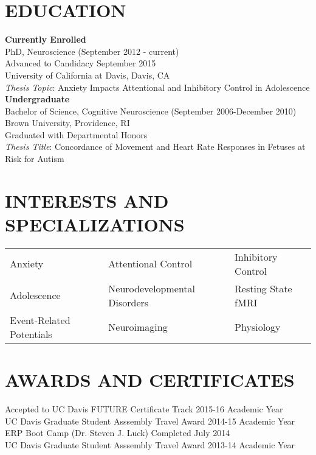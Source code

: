 \documentclass[line,margin,10pt]{res}
\begin{document}
\address{1333 Arlington Blvd Apt 6, Davis, CA 95616}
\address{phone:(401) 440 5228\\ e-mail:abbiepopa@gmail.com}


 
\begin{resume}
 
\section{EDUCATION} 
\textbf{Currently Enrolled}\\PhD, Neuroscience (September 2012 - current)\\
Advanced to Candidacy September 2015\\
University of California at Davis, Davis, CA\\
\emph{Thesis Topic}: Anxiety Impacts Attentional and Inhibitory Control in Adolescence\\
\textbf{Undergraduate}\\Bachelor of Science, Cognitive Neuroscience (September 2006-December 2010)\\
                Brown University, Providence, RI \\
                Graduated with Departmental Honors\\
									\emph{Thesis Title}: Concordance of Movement and Heart Rate Responses in Fetuses at Risk for Autism\\
								
\section {INTERESTS AND SPECIALIZATIONS}
\begin{tabular}{ l l l }
Anxiety & \quad \quad Attentional Control & \quad \quad Inhibitory Control\\
Adolescence & \quad \quad Neurodevelopmental Disorders & \quad \quad Resting State fMRI\\
Event-Related Potentials & \quad \quad Neuroimaging & \quad \quad Physiology\\ 
\end{tabular}

\section{AWARDS AND CERTIFICATES}
Accepted to UC Davis FUTURE Certificate Track \hfill 2015-16 Academic Year\\
UC Davis Graduate Student Asssembly Travel Award \hfill 2014-15 Academic Year\\
ERP Boot Camp (Dr. Steven J. Luck) \hfill Completed July 2014\\
UC Davis Graduate Student Asssembly Travel Award \hfill 2013-14 Academic Year


\end{resume}
\end{document}
